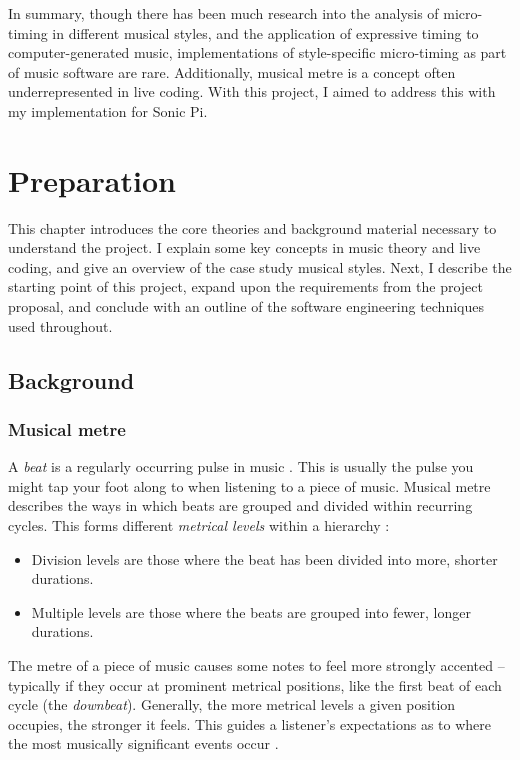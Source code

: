 \documentclass[12pt,twoside,openright]{report}
\begin{document}
In summary, though there has been much research into the analysis of
micro-timing in different musical styles, and the application of expressive
timing to computer-generated music, implementations of style-specific
micro-timing as part of music software are rare. Additionally, musical metre is
a concept often underrepresented in live coding. With this project, I aimed to
address this with my implementation for Sonic Pi.





\chapter{Preparation} \label{preparation}

This chapter introduces the core theories and background material necessary
to understand the project. I explain some key concepts in music theory and
live coding, and give an overview of the case study musical styles. Next, I describe the starting point of this project, expand upon the requirements from
the project proposal, and conclude with an outline of the software engineering
techniques used throughout.



\section{Background} \label{background}


\subsection{Musical metre} \label{metre_background}

A \emph{beat} is a regularly occurring pulse in music \cite{omt2021}. This is usually the pulse you might tap your foot along to when listening to a piece of music. Musical metre
describes the ways in which beats are grouped and divided within recurring
cycles. This forms different \emph{metrical levels} within a hierarchy \cite{london2012}:

\begin{itemize}
    \item Division levels are those where the beat has been divided into more, shorter durations.
    \item Multiple levels are those where the beats are grouped into fewer, longer durations.
\end{itemize}

The metre of a piece of music causes some notes to feel more strongly accented \cite{london2012} -- typically if they occur at prominent metrical positions, like the first beat of each cycle (the \emph{downbeat}). Generally, the more metrical levels a given position occupies, the stronger it feels. This guides a listener's expectations as to where the most musically significant events occur \cite{london2012}.
\end{document}
